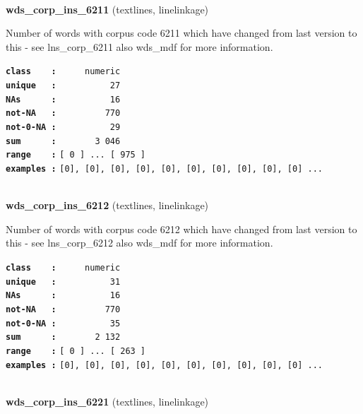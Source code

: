 \documentclass[]{article}
\begin{document}
~

\textbf{wds\_corp\_ins\_6211} (textlines, linelinkage)

Number of words with corpus code 6211 which have changed from last
version to this - see lns\_corp\_6211 also wds\_mdf for more
information.

\textbf{\texttt{class\ \ \ \ :}} \texttt{~~~~~numeric}\\
\textbf{\texttt{unique\ \ \ :}} \texttt{~~~~~~~~~~27}\\
\textbf{\texttt{NAs\ \ \ \ \ \ :}} \texttt{~~~~~~~~~~16}\\
\textbf{\texttt{not-NA\ \ \ :}} \texttt{~~~~~~~~~770}\\
\textbf{\texttt{not-0-NA\ :}} \texttt{~~~~~~~~~~29}\\
\textbf{\texttt{sum\ \ \ \ \ \ :}} \texttt{~~~~~~~3~046}\\
\textbf{\texttt{range\ \ \ \ :}}
\texttt{{[}\ 0\ {]}\ ...\ {[}\ 975\ {]}}\\
\textbf{\texttt{examples\ :}}
\texttt{{[}0{]},\ {[}0{]},\ {[}0{]},\ {[}0{]},\ {[}0{]},\ {[}0{]},\ {[}0{]},\ {[}0{]},\ {[}0{]},\ {[}0{]}\ ...}\\

~

\textbf{wds\_corp\_ins\_6212} (textlines, linelinkage)

Number of words with corpus code 6212 which have changed from last
version to this - see lns\_corp\_6212 also wds\_mdf for more
information.

\textbf{\texttt{class\ \ \ \ :}} \texttt{~~~~~numeric}\\
\textbf{\texttt{unique\ \ \ :}} \texttt{~~~~~~~~~~31}\\
\textbf{\texttt{NAs\ \ \ \ \ \ :}} \texttt{~~~~~~~~~~16}\\
\textbf{\texttt{not-NA\ \ \ :}} \texttt{~~~~~~~~~770}\\
\textbf{\texttt{not-0-NA\ :}} \texttt{~~~~~~~~~~35}\\
\textbf{\texttt{sum\ \ \ \ \ \ :}} \texttt{~~~~~~~2~132}\\
\textbf{\texttt{range\ \ \ \ :}}
\texttt{{[}\ 0\ {]}\ ...\ {[}\ 263\ {]}}\\
\textbf{\texttt{examples\ :}}
\texttt{{[}0{]},\ {[}0{]},\ {[}0{]},\ {[}0{]},\ {[}0{]},\ {[}0{]},\ {[}0{]},\ {[}0{]},\ {[}0{]},\ {[}0{]}\ ...}\\

~

\textbf{wds\_corp\_ins\_6221} (textlines, linelinkage)
\end{document}
